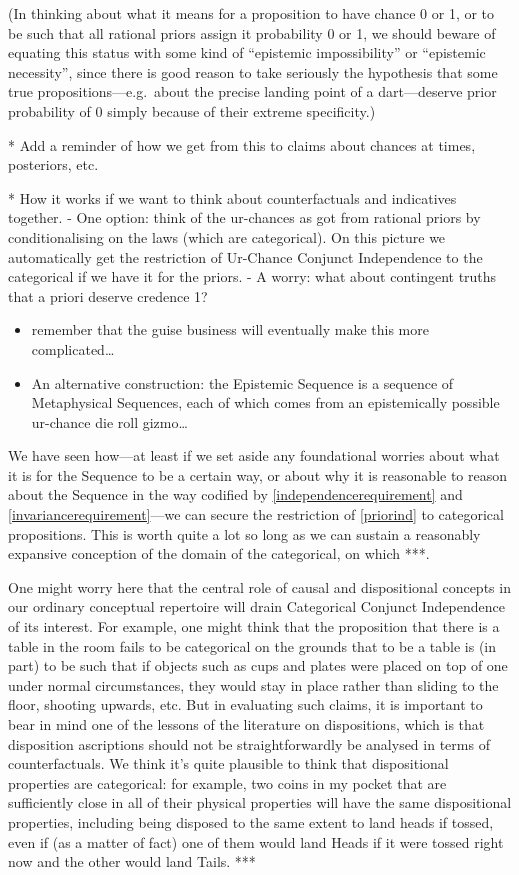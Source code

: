 \documentclass[If.tex]{subfiles}
\begin{document}
(In thinking about what it means for a proposition to have chance 0 or 1, or to be such that all rational priors assign it probability 0 or 1, we should beware of equating this status with some kind of “epistemic impossibility” or “epistemic necessity”, since there is good reason to take seriously the hypothesis that some true propositions---e.g.~about the precise landing point of a dart---deserve prior probability of 0 simply because of their extreme specificity.)
  
* Add a reminder of how we get from this to claims about chances at times, posteriors, etc.  

* How it works if we want to think about counterfactuals and indicatives together.  
	- One option: think of the ur-chances as got from rational priors by conditionalising on the laws (which are categorical).  On this picture we automatically get the restriction of Ur-Chance Conjunct Independence to the categorical if we have it for the priors.  
	- A worry: what about contingent truths that a priori deserve credence 1?  

\begin{itemize}
	\item
  remember that the guise business will eventually make this more
  complicated\ldots{}
\item
  An alternative construction: the Epistemic Sequence is a sequence of
  Metaphysical Sequences, each of which comes from an epistemically
  possible ur-chance die roll gizmo\ldots{}
\end{itemize}

We have seen how---at least if we set aside any foundational worries about what it is for the Sequence to be a certain way, or about why it is reasonable to reason about the Sequence in the way codified by \ref{independencerequirement} and \ref{invariancerequirement}---we can secure the restriction of \ref{priorind} to categorical propositions.  This is worth quite a lot so long as we can sustain a reasonably expansive conception of the domain of the categorical, on which ***.  

One might worry here that the central role of causal and dispositional concepts in our ordinary conceptual repertoire will drain Categorical Conjunct Independence of its interest.  For example, one might think that the proposition that there is a table in the room fails to be categorical on the grounds that to be a table is (in part) to be such that if objects such as cups and plates were placed on top of one under normal circumstances, they would stay in place rather than sliding to the floor, shooting upwards, etc.  But in evaluating such claims, it is important to bear in mind one of the lessons of the literature on dispositions, which is that disposition ascriptions should not be straightforwardly be analysed in terms of counterfactuals.  We think it's quite plausible to think that dispositional properties are categorical: for example, two coins in my pocket that are sufficiently close in all of their physical properties will have the same dispositional properties, including being disposed to the same extent to land heads if tossed, even if (as a matter of fact) one of them would land Heads if it were tossed right now and the other would land Tails.  ***
\end{document}
